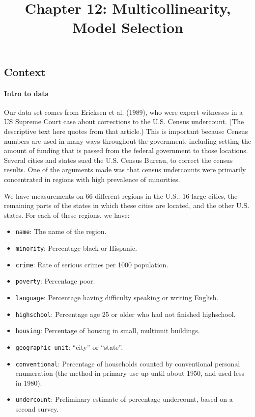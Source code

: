 \documentclass[landscape]{article}
\title{Chapter 12: Multicollinearity, Model Selection}
\author{}
\date{}
\providecommand{\tightlist}{%
  \setlength{\itemsep}{0pt}\setlength{\parskip}{0pt}}
\let\oldparagraph\paragraph
\renewcommand{\paragraph}[1]{\oldparagraph{#1}\mbox{}}
\begin{document}
\maketitle

\subsection{Context}\label{context}

\paragraph{Intro to data}\label{intro-to-data}

Our data set comes from Ericksen et al. (1989), who were expert
witnesses in a US Supreme Court case about corrections to the U.S.
Census undercount. (The descriptive text here quotes from that article.)
This is important because Census numbers are used in many ways
throughout the government, including setting the amount of funding that
is passed from the federal government to those locations. Several cities
and states sued the U.S. Census Bureau, to correct the census results.
One of the arguments made was that census undercounts were primarily
concentrated in regions with high prevalence of minorities.

We have measurements on 66 different regions in the U.S.: 16 large
cities, the remaining parts of the states in which these cities are
located, and the other U.S. states. For each of these regions, we have:

\begin{itemize}
\tightlist
\item
  \texttt{name}: The name of the region.
\item
  \texttt{minority}: Percentage black or Hispanic.
\item
  \texttt{crime}: Rate of serious crimes per 1000 population.
\item
  \texttt{poverty}: Percentage poor.
\item
  \texttt{language}: Percentage having difficulty speaking or writing
  English.
\item
  \texttt{highschool}: Percentage age 25 or older who had not finished
  highschool.
\item
  \texttt{housing}: Percentage of housing in small, multiunit buildings.
\item
  \texttt{geographic\_unit}: ``city'' or ``state''.
\item
  \texttt{conventional}: Percentage of households counted by
  conventional personal enumeration (the method in primary use up until
  about 1950, and used less in 1980).
\item
  \texttt{undercount}: Preliminary estimate of percentage undercount,
  based on a second survey.
\end{itemize}
\end{document}
